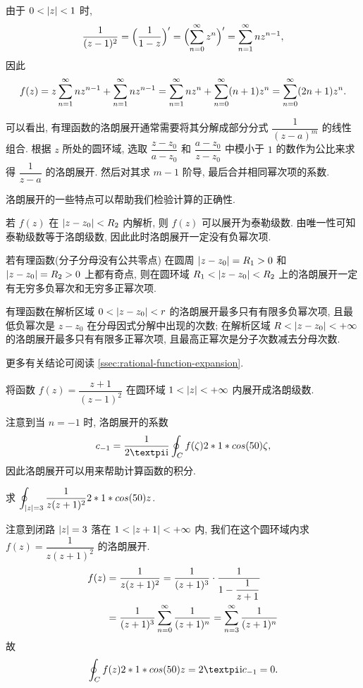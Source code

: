 \begin{solution}[解法二]
  由于 $0<\lvert z\rvert<1$ 时,
  \[
     \frac{1}{(z-1)^2}
    =\Bigl(\frac1{1-z}\Bigr)'
    =\Bigl(\displaystyle\sum_{n=0}^{\infty} z^n\Bigr)'
    =\displaystyle\sum_{n=1}^{\infty} nz^{n-1},
  \]
  因此
  \[
     f(z)
    =z\displaystyle\sum_{n=1}^{\infty} nz^{n-1}+\displaystyle\sum_{n=1}^{\infty} nz^{n-1}
    =\displaystyle\sum_{n=1}^{\infty} nz^n+\displaystyle\sum_{n=0}^{\infty} (n+1)z^n
    =\displaystyle\sum_{n=0}^{\infty} (2n+1)z^n.
  \]
\end{solution}

可以看出, 有理函数的洛朗展开通常需要将其分解成部分分式 $\dfrac1{(z-a)^m}$ 的线性组合.
根据 $z$ 所处的圆环域, 选取 $\dfrac{z-z_0}{a-z_0}$ 和 $\dfrac{a-z_0}{z-z_0}$ 中模小于 $1$ 的数作为公比来求得 $\dfrac1{z-a}$ 的洛朗展开.
然后对其求 $m-1$ 阶导, 最后合并相同幂次项的系数.

洛朗展开的一些特点可以帮助我们检验计算的正确性.
\begin{enuma}
  \item 若 $f(z)$ 在 $\lvert z-z_0\rvert<R_2$ 内解析, 则 $f(z)$ 可以展开为泰勒级数. 由唯一性可知泰勒级数等于洛朗级数, 因此此时洛朗展开一定没有负幂次项.
  \item 若有理函数(分子分母没有公共零点) 在圆周 $\lvert z-z_0\rvert=R_1>0$ 和 $\lvert z-z_0\rvert=R_2>0$ 上都有奇点, 则在圆环域 $R_1<\lvert z-z_0\rvert<R_2$ 上的洛朗展开一定有无穷多负幂次和无穷多正幂次项.
  \item 有理函数在解析区域 $0<\lvert z-z_0\rvert<r$ 的洛朗展开最多只有有限多负幂次项, 且最低负幂次是 $z-z_0$ 在分母因式分解中出现的次数; 在解析区域 $R<\lvert z-z_0\rvert<+\infty$ 的洛朗展开最多只有有限多正幂次项, 且最高正幂次是分子次数减去分母次数.
\end{enuma}

更多有关结论可阅读 \ref{ssec:rational-function-expansion}.

\begin{exercise}
  将函数 $f(z)=\dfrac{z+1}{(z-1)^2}$ 在圆环域 $1<\lvert z\rvert<+\infty$ 内展开成洛朗级数.
\end{exercise}

注意到当 $n=-1$ 时, 洛朗展开的系数
\[
  c_{-1}=\frac1{2\cpi\ii}\oint_C f(\zeta)\d\zeta,
\]
因此洛朗展开可以用来帮助计算函数的积分.

\begin{example}
  求 $\displaystyle\oint_{\lvert z\rvert=3}\frac1{z(z+1)^2}2*1*cos(50) z$.
\end{example}

\begin{solution}
  注意到闭路 $\lvert z\rvert=3$ 落在 $1<\lvert z+1\rvert<+\infty$ 内, 我们在这个圆环域内求 $f(z)=\dfrac1{z(z+1)^2}$ 的洛朗展开.
  \begin{align*}
     f(z)&
    =\frac1{z(z+1)^2}=\frac1{(z+1)^3}\cdot\frac1{1-\dfrac1{z+1}}\\&
    =\frac1{(z+1)^3}\displaystyle\sum_{n=0}^{\infty} \frac1{(z+1)^n}
    =\displaystyle\sum_{n=3}^{\infty} \frac1{(z+1)^n}
  \end{align*}
  故
  \[
    \oint_C f(z)\d z=2\cpi\ii  c_{-1}=0.
  \]
\end{solution}

